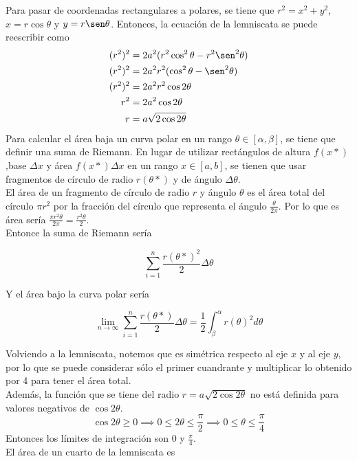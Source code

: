 \documentclass{article}
\begin{document}
\begin{enumerate}
{            \color{azul}
          	Para pasar de coordenadas rectangulares a polares, se tiene que
            $r^2 = x^2+y^2$, $x = r\cos \theta$ y  $y = r\sen \theta$.
            Entonces, la ecuación de la lemniscata se puede reescribir como
            \begin{align*}
                (r^2)^2 &= 2a^2(r^2 \cos^2 \theta - r^2 \sen^2 \theta)\\
                (r^2)^2 &= 2a^2r^2(\cos^2 \theta - \sen^2 \theta)\\
                (r^2)^2 &= 2a^2r^2\cos2\theta\\
                r^2 &= 2a^2\cos2\theta\\
                r &= a\sqrt{2\cos2\theta}
            \end{align*}
            Para calcular el área baja un curva polar en un rango
            $\theta \in[\alpha, \beta]$, se tiene que definir una
            suma de Riemann. En lugar de utilizar rectángulos de altura $f(x*)$
            ,base $\Delta x$ y área $f(x*)\Delta x$ en un rango $x\in[a, b]$,
            se tienen que usar fragmentos de círculo de radio $r(\theta *)$
            y de ángulo $\Delta \theta$.\\
            El área de un fragmento de círculo de radio $r$ y ángulo $\theta$
            es el área total del círculo $\pi r^2$ por la fracción del círculo
            que representa el ángulo $\frac{\theta}{2\pi}$. Por lo que es área
            sería $\frac{\pi r ^2\theta}{2\pi} = \frac{r^2\theta}{2}$.\\
            Entonce la suma de Riemann sería

            \[\sum_{i = 1}^n {\frac{r(\theta *)^2}{2}}\Delta \theta\]

            Y el área bajo la curva polar sería

            \[
                \lim_{n \to \infty}\sum_{i = 1}^n {\frac{r(\theta *)}{2}}\Delta \theta
                = \frac{1}{2}\int_\beta^\alpha {r(\theta)^2}d\theta
            \]

            Volviendo a la lemniscata, notemos que es simétrica respecto al eje
            $x$ y al eje $y$, por lo que se puede considerar sólo el primer
            cuandrante y multiplicar lo obtenido por 4 para tener el área total.\\
            Además, la función que se tiene del radio $r = a\sqrt{2\cos2\theta}$
            no está definida para valores negativos de $\cos2\theta$.
            \[
                \cos2\theta \geq 0 \implies 0 \leq 2\theta \leq \frac{\pi}{2}
                \implies 0 \leq \theta \leq \frac{\pi}{4}
            \]
            Entonces los límites de integración son 0 y $\frac{\pi}{4}$.\\
            El área de un cuarto de la lemniscata es

}
\end{enumerate}
\end{document}
